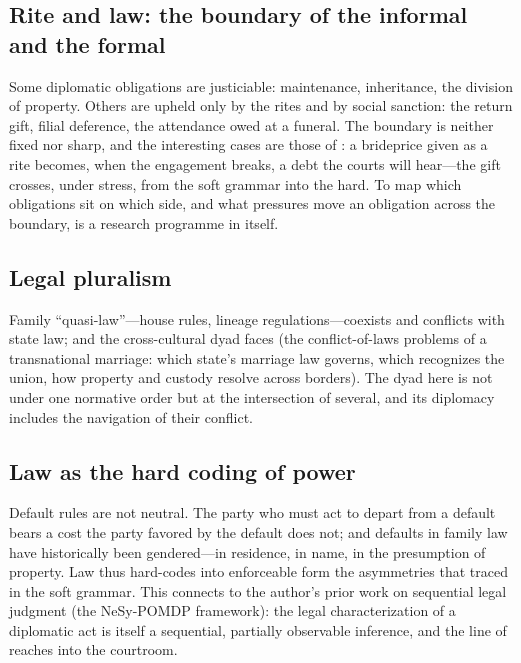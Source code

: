 \subsection{Rite and law: the boundary of the informal and the formal}
Some diplomatic obligations are justiciable: maintenance, inheritance, the division of property. Others are upheld only by the rites and by social sanction: the return gift, filial deference, the attendance owed at a funeral. The boundary is neither fixed nor sharp, and the interesting cases are those of : a brideprice given as a rite becomes, when the engagement breaks, a debt the courts will hear---the gift crosses, under stress, from the soft grammar into the hard. To map which obligations sit on which side, and what pressures move an obligation across the boundary, is a research programme in itself.

\subsection{Legal pluralism}
Family ``quasi-law''---house rules, lineage regulations---coexists and conflicts with state law; and the cross-cultural dyad faces  (the conflict-of-laws problems of a transnational marriage: which state's marriage law governs, which recognizes the union, how property and custody resolve across borders). The dyad here is not under one normative order but at the intersection of several, and its diplomacy includes the navigation of their conflict.

\subsection{Law as the hard coding of power}
Default rules are not neutral. The party who must act to depart from a default bears a cost the party favored by the default does not; and defaults in family law have historically been gendered---in residence, in name, in the presumption of property. Law thus hard-codes into enforceable form the asymmetries that  traced in the soft grammar. This connects to the author's prior work on sequential legal judgment (the NeSy-POMDP framework): the legal characterization of a diplomatic act is itself a sequential, partially observable inference, and the line of  reaches into the courtroom.

